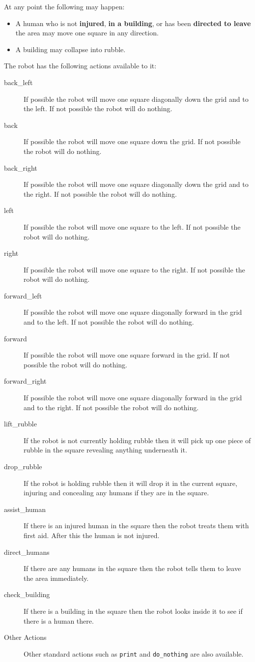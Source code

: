 At any point the following may happen:
\begin{itemize}
\item A human who is not {\bf injured}, {\bf in a building}, or has
  been {\bf directed to leave} the area may move one square in any
  direction. 
\item A building may collapse into rubble.
\end{itemize}

The robot  has the following actions available to it:
\begin{description}
\item[back\_left] If possible the robot will move one square diagonally down the grid and to the left.  If not possible the robot will do nothing.
\item[back] If possible the robot will move one square down the grid.  If not possible the robot will do nothing.
\item[back\_right] If possible the robot will move one square diagonally down the grid and to the right.  If not possible the robot will do nothing.
\item[left] If possible the robot will move one square to the left.  If not possible the robot will do nothing.
\item[right] If possible the robot will move one square to the right.  If not possible the robot will do nothing.
\item[forward\_left] If possible the robot will move one square diagonally forward in the grid and to the left.  If not possible the robot will do nothing.
\item[forward] If possible the robot will move one square forward in the grid.  If not possible the robot will do nothing.
\item[forward\_right] If possible the robot will move one square diagonally forward in the grid and to the right.  If not possible the robot will do nothing.
\item[lift\_rubble] If the robot is not currently holding rubble then it will pick up one piece of rubble in the square revealing anything underneath it.
\item[drop\_rubble] If the robot is holding rubble then it will drop it in the current square, injuring and concealing any humans if they are in the square.
\item[assist\_human] If there is an injured human in the square then the robot treats them with first aid.  After this the human is not injured.
\item[direct\_humans] If there are any humans in the square then the robot tells them to leave the area immediately.
\item[check\_building] If there is a building in the square then the robot looks inside it to see if there is a human there.
\item[Other Actions] Other standard actions such as \texttt{print} and \texttt{do\_nothing} are also available.
\end{description}

